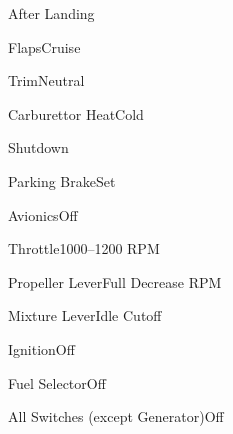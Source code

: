 \documentclass[sim-use]{checklist}
\begin{document}
\begin{checklist}{After Landing}
  \item{Flaps}{Cruise}
  \item{Trim}{Neutral}
  \item{Carburettor Heat}{Cold}
\end{checklist}

\begin{checklist}{Shutdown}
  \item{Parking Brake}{Set}
  \item{Avionics}{Off}
  \item{Throttle}{1000--1200 RPM}
  \item{Propeller Lever}{Full Decrease RPM}
  \item{Mixture Lever}{Idle Cutoff}
  \item{Ignition}{Off}
  \item{Fuel Selector}{Off}
  \item{All Switches (except Generator)}{Off}
\end{checklist}
\end{document}
